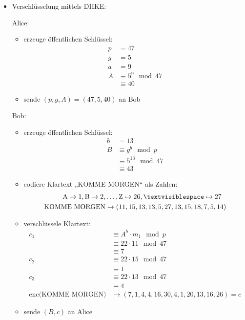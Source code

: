\documentclass[
  a4paper,
  11pt,
]{article}
\begin{document}
\begin{itemize}
  \item Verschlüsselung mittels DHKE:

    Alice:
    \begin{itemize}
      \item erzeuge öffentlichen Schlüssel:
        \begin{align*}
          p & = 47\\
          g & = 5\\
          a & = 9\\
          A & \equiv  5^9 \mod 47\\
            & \equiv 40
        \end{align*}
      \item sende $(p, g, A) = (47, 5, 40)$ an Bob
    \end{itemize}

    Bob:
    \begin{itemize}
      \item erzeuge öffentlichen Schlüssel:
        \begin{align*}
          b & = 13\\
          B & \equiv g^b \mod p\\
            & \equiv 5^{13} \mod 47\\
            & \equiv 43
        \end{align*}
      \item codiere Klartext „KOMME MORGEN“ als Zahlen:
        \begin{align*}
          \text{A} \mapsto 1, \text{B} \mapsto 2, & \ldots, \text{Z} \mapsto 26,
          \textvisiblespace \mapsto 27\\
          \text{KOMME MORGEN} & \to (11, 15, 13, 13, 5, 27, 13, 15, 18, 7, 5, 14)
        \end{align*}
      \item verschlüssele Klartext:
        \begin{align*}
          c_1 & \equiv A^b \cdot m_1 \mod p\\
              & \equiv 22 \cdot 11 \mod 47\\
              & \equiv 7\\
          c_2 & \equiv 22 \cdot 15 \mod 47\\
              & \equiv 1\\
          c_3 & \equiv 22 \cdot 13 \mod 47\\
              & \equiv 4\\
          \text{enc(KOMME MORGEN)} & \to (7, 1, 4, 4, 16, 30, 4, 1, 20, 13, 16,
          26) = c
        \end{align*}
      \item sende $(B, c)$ an Alice
    \end{itemize}


\end{itemize}
\end{document}
